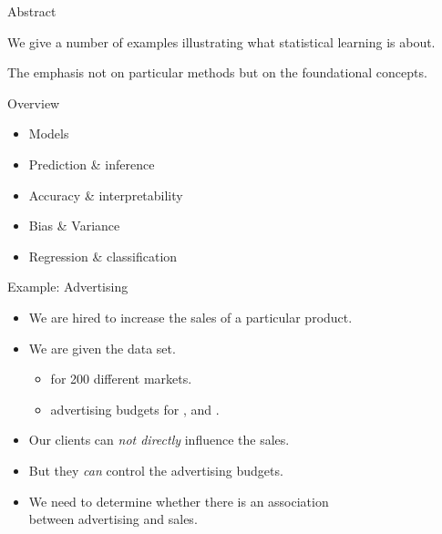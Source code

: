 \documentclass[mathserif, aspectratio=169]{beamer}
\subtitle{\bfseries%
  {Statistical Learning}\\%
  {\tiny\it what is it?, models, regression, classification, prediction, inference, accuracy, bias, variance}\\%
}
\begin{document}


\begin{frame}{Abstract}

	\begin{blurb}
		We give a number of examples illustrating what statistical learning
		is about.
		
		The emphasis not on particular methods but on the foundational concepts.

	\end{blurb}
\end{frame}

\begin{frame}{Overview}
	\begin{itemize}
		\item Models
		\item Prediction \& inference
		\item Accuracy  \& interpretability
		\item Bias \& Variance
		\item Regression \& classification
	\end{itemize}
\end{frame}

\begin{frame}{Example: Advertising}
	\begin{itemize}
		\item We are hired to increase the sales of a particular product.
		\item We are given the  data set.
			\begin{itemize}
				\item {} for 200 different markets.
				\item advertising budgets for ,  and .
			\end{itemize}
		\item Our clients can \emph{not directly} influence the sales.
		\item But they \emph{can} control the advertising budgets.
		\item We need to determine whether there is an association \\
			between advertising and sales. 
	\end{itemize}
\end{frame}
\end{document}
